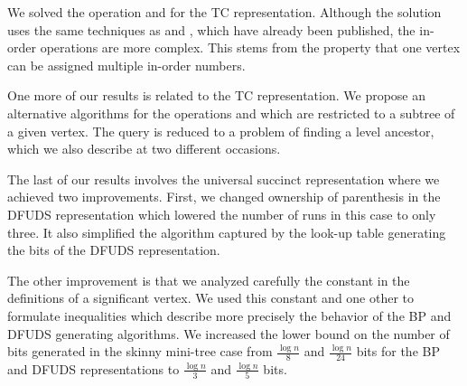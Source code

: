 We solved the operation \inRank{} and \inSelect{} for the TC representation.
Although the solution uses the same techniques as \dfudsRank{} and \dfudsSelect{}, which have already been published, the in-order operations are more complex.
This stems from the property that one vertex can be assigned multiple in-order numbers.

One more of our results is related to the TC representation.
We propose an alternative algorithms for the operations \levelFirst{} and \levelLast{} which are restricted to a subtree of a given vertex.
The query is reduced to a problem of finding a level ancestor, which we also describe at two different occasions.

The last of our results involves the universal succinct representation where we achieved two improvements.
First, we changed ownership of parenthesis in the DFUDS representation which lowered the number of runs in this case to only three.
It also simplified the algorithm captured by the look-up table generating the bits of the DFUDS representation.

The other improvement is that we analyzed carefully the constant in the definitions of a significant vertex.
We used this constant and one other to formulate inequalities which describe more precisely the behavior of the BP and DFUDS generating algorithms.
We increased the lower bound on the number of bits generated in the skinny mini-tree case from $\frac{\log n}{8}$ and $\frac{\log n}{24}$ bits for the BP and DFUDS representations to $\frac{\log n}{3}$ and $\frac{\log n}{5}$ bits.

